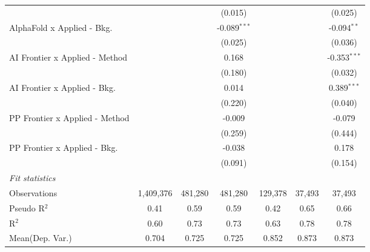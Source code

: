 \begin{tabular}{lcccccc}
                                  &                &                & (0.015)        &                &                & (0.025)\\   
   AlphaFold x Applied - Bkg.     &                &                & -0.089$^{***}$ &                &                & -0.094$^{**}$\\   
                                  &                &                & (0.025)        &                &                & (0.036)\\   
   AI Frontier x Applied - Method &                &                & 0.168          &                &                & -0.353$^{***}$\\   
                                  &                &                & (0.180)        &                &                & (0.032)\\   
   AI Frontier x Applied - Bkg.   &                &                & 0.014          &                &                & 0.389$^{***}$\\   
                                  &                &                & (0.220)        &                &                & (0.040)\\   
   PP Frontier x Applied - Method &                &                & -0.009         &                &                & -0.079\\   
                                  &                &                & (0.259)        &                &                & (0.444)\\   
   PP Frontier x Applied - Bkg.   &                &                & -0.038         &                &                & 0.178\\   
                                  &                &                & (0.091)        &                &                & (0.154)\\   
   \midrule
   \emph{Fit statistics}\\
   Observations                   & 1,409,376      & 481,280        & 481,280        & 129,378        & 37,493         & 37,493\\  
   Pseudo R$^2$                   & 0.41           & 0.59           & 0.59           & 0.42           & 0.65           & 0.66\\  
   R$^2$                          & 0.60           & 0.73           & 0.73           & 0.63           & 0.78           & 0.78\\  
Mean(Dep. Var.) & 0.704 & 0.725 & 0.725 & 0.852 & 0.873 & 0.873 \\
   

\end{tabular}
